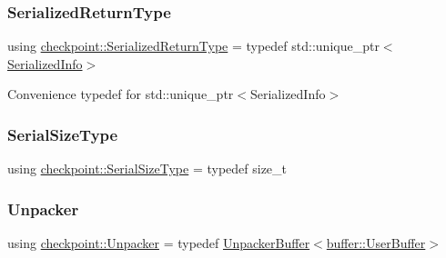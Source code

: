 \mbox{\label{namespacecheckpoint_aa61e2b491f405a63a394f9aad528c37a}} 
\subsubsection{\texorpdfstring{Serialized\+Return\+Type}{SerializedReturnType}}
{\footnotesize\ttfamily using \hyperlink{namespacecheckpoint_aa61e2b491f405a63a394f9aad528c37a}{checkpoint\+::\+Serialized\+Return\+Type} = typedef std\+::unique\+\_\+ptr$<$\hyperlink{structcheckpoint_1_1_serialized_info}{Serialized\+Info}$>$}



Convenience typedef for {\ttfamily std\+::unique\+\_\+ptr$<$\+Serialized\+Info$>$} 

\mbox{\label{namespacecheckpoint_a083f6674da3f94c2901b18c6d238217c}} 
\subsubsection{\texorpdfstring{Serial\+Size\+Type}{SerialSizeType}}
{\footnotesize\ttfamily using \hyperlink{namespacecheckpoint_a083f6674da3f94c2901b18c6d238217c}{checkpoint\+::\+Serial\+Size\+Type} = typedef size\+\_\+t}

\mbox{\label{namespacecheckpoint_af36cfec8b3ef7476bb97b3b12908370d}} 
\subsubsection{\texorpdfstring{Unpacker}{Unpacker}}
{\footnotesize\ttfamily using \hyperlink{namespacecheckpoint_af36cfec8b3ef7476bb97b3b12908370d}{checkpoint\+::\+Unpacker} = typedef \hyperlink{structcheckpoint_1_1_unpacker_buffer}{Unpacker\+Buffer}$<$\hyperlink{structcheckpoint_1_1buffer_1_1_user_buffer}{buffer\+::\+User\+Buffer}$>$}

\mbox{\label{namespacecheckpoint_a0efc06d99dce79e452b9d1b503059a74}} 
